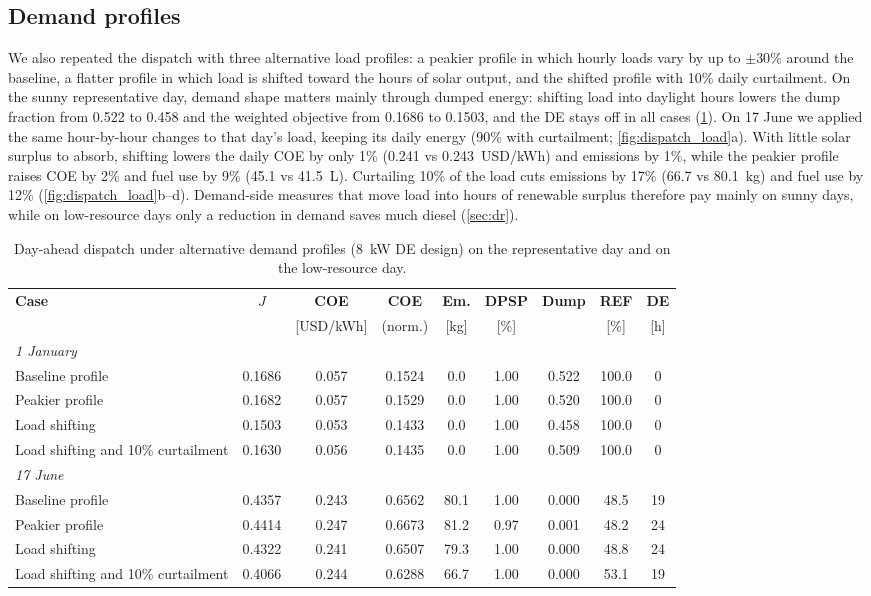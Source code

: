 \documentclass[final,3p,times]{elsarticle}
\begin{document}
\subsection{Demand profiles}
We also repeated the dispatch with three alternative load profiles: a peakier profile in which hourly loads vary by up to $\pm 30\%$ around the baseline, a flatter profile in which load is shifted toward the hours of solar output, and the shifted profile with 10\% daily curtailment. On the sunny representative day, demand shape matters mainly through dumped energy: shifting load into daylight hours lowers the dump fraction from 0.522 to 0.458 and the weighted objective from 0.1686 to 0.1503, and the DE stays off in all cases (\cref{tab:dispatch_robust_load}). On 17 June we applied the same hour-by-hour changes to that day's load, keeping its daily energy (90\% with curtailment; \cref{fig:dispatch_load}a). With little solar surplus to absorb, shifting lowers the daily COE by only 1\% (0.241 vs 0.243~USD/kWh) and emissions by 1\%, while the peakier profile raises COE by 2\% and fuel use by 9\% (45.1 vs 41.5~L). Curtailing 10\% of the load cuts emissions by 17\% (66.7 vs 80.1~kg) and fuel use by 12\% (\cref{fig:dispatch_load}b--d). Demand-side measures that move load into hours of renewable surplus therefore pay mainly on sunny days, while on low-resource days only a reduction in demand saves much diesel (\cref{sec:dr}).

\begin{table}[htbp]
\centering
\small
\begin{tabular}{l c c c c c c c c}
\toprule
\textbf{Case} & \textbf{$J$} & \textbf{COE} & \textbf{COE} & \textbf{Em.} & \textbf{DPSP} & \textbf{Dump} & \textbf{REF} & \textbf{DE} \\
 & & [USD/kWh] & (norm.) & [kg] & [\%] & & [\%] & [h] \\
\midrule
\multicolumn{9}{l}{\textit{1 January}} \\
Baseline profile & 0.1686 & 0.057 & 0.1524 & 0.0 & 1.00 & 0.522 & 100.0 & 0 \\
Peakier profile & 0.1682 & 0.057 & 0.1529 & 0.0 & 1.00 & 0.520 & 100.0 & 0 \\
Load shifting & 0.1503 & 0.053 & 0.1433 & 0.0 & 1.00 & 0.458 & 100.0 & 0 \\
Load shifting and 10\% curtailment & 0.1630 & 0.056 & 0.1435 & 0.0 & 1.00 & 0.509 & 100.0 & 0 \\
\midrule
\multicolumn{9}{l}{\textit{17 June}} \\
Baseline profile & 0.4357 & 0.243 & 0.6562 & 80.1 & 1.00 & 0.000 & 48.5 & 19 \\
Peakier profile & 0.4414 & 0.247 & 0.6673 & 81.2 & 0.97 & 0.001 & 48.2 & 24 \\
Load shifting & 0.4322 & 0.241 & 0.6507 & 79.3 & 1.00 & 0.000 & 48.8 & 24 \\
Load shifting and 10\% curtailment & 0.4066 & 0.244 & 0.6288 & 66.7 & 1.00 & 0.000 & 53.1 & 19 \\
\bottomrule
\end{tabular}
\caption{\label{tab:dispatch_robust_load} Day-ahead dispatch under alternative demand profiles (8~kW DE design) on the representative day and on the low-resource day.}
\end{table}
\end{document}
